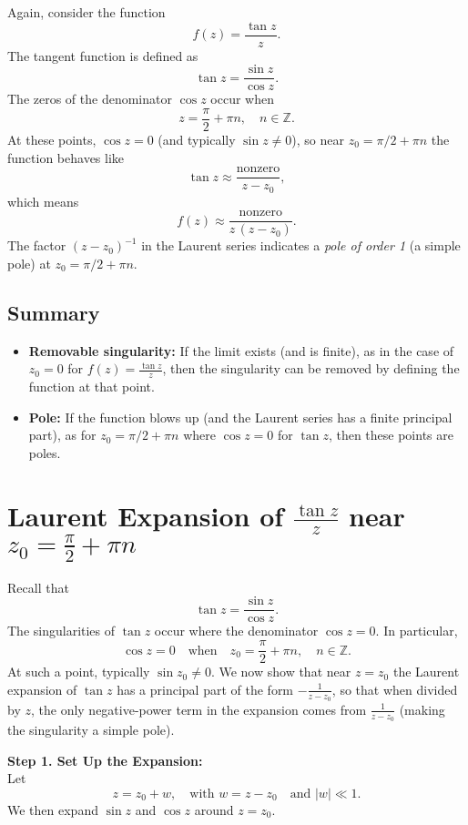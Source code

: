 \documentclass[12pt]{article}
\theoremstyle{definition} %
\theoremstyle{plain} %
\begin{document}
Again, consider the function
\[
f(z) = \frac{\tan z}{z}.
\]
The tangent function is defined as
\[
\tan z = \frac{\sin z}{\cos z}.
\]
The zeros of the denominator \(\cos z\) occur when
\[
z = \frac{\pi}{2} + \pi n, \quad n\in\mathbb{Z}.
\]
At these points, \(\cos z = 0\) (and typically \(\sin z \neq 0\)), so near \(z_0 = \pi/2+\pi n\) the function behaves like
\[
\tan z \approx \frac{\text{nonzero}}{z-z_0},
\]
which means
\[
f(z) \approx \frac{\text{nonzero}}{z\,(z-z_0)}.
\]
The factor \((z-z_0)^{-1}\) in the Laurent series indicates a \emph{pole of order 1} (a simple pole) at \(z_0=\pi/2+\pi n\).

\subsection*{Summary}

\begin{itemize}
  \item \textbf{Removable singularity:} If the limit exists (and is finite), as in the case of \(z_0=0\) for \(f(z)=\frac{\tan z}{z}\), then the singularity can be removed by defining the function at that point.
  \item \textbf{Pole:} If the function blows up (and the Laurent series has a finite principal part), as for \(z_0=\pi/2+\pi n\) where \(\cos z=0\) for \(\tan z\), then these points are poles.
\end{itemize}
\section*{Laurent Expansion of \(\frac{\tan z}{z}\) near \(z_0=\frac{\pi}{2}+\pi n\)}

Recall that
\[
\tan z=\frac{\sin z}{\cos z}.
\]
The singularities of \(\tan z\) occur where the denominator \(\cos z=0\). In particular,
\[
\cos z=0 \quad\text{when}\quad z_0=\frac{\pi}{2}+\pi n,\quad n\in\mathbb{Z}.
\]
At such a point, typically \(\sin z_0\neq 0\). We now show that near \(z=z_0\) the Laurent expansion of \(\tan z\) has a principal part of the form \(-\frac{1}{z-z_0}\), so that when divided by \(z\), the only negative-power term in the expansion comes from \(\frac{1}{z-z_0}\) (making the singularity a simple pole).

\bigskip

\textbf{Step 1. Set Up the Expansion:}\\[1mm]
Let 
\[
z=z_0+w,\quad \text{with } w=z-z_0 \quad \text{and } |w|\ll 1.
\]
We then expand \(\sin z\) and \(\cos z\) around \(z=z_0\).
\end{document}
